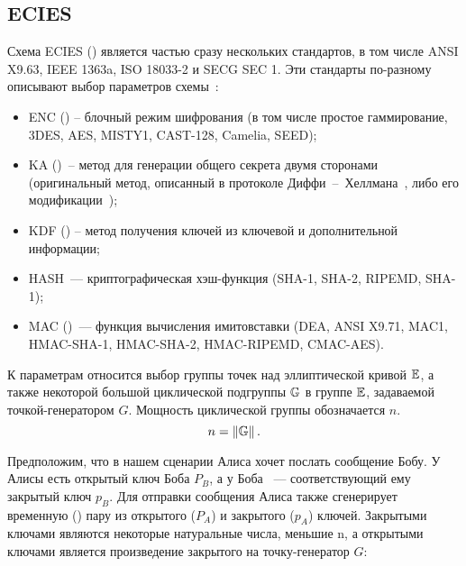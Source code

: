 \subsection{ECIES}

Схема ECIES () является частью сразу нескольких стандартов, в том числе ANSI X9.63, IEEE 1363a, ISO 18033-2 и SECG SEC 1. Эти стандарты по-разному описывают выбор параметров схемы~\cite{Martinez:Encinas:Avila:2010}:

\begin{itemize}
	\item ENC () -- блочный режим шифрования (в том числе простое гаммирование, 3DES, AES, MISTY1, CAST-128, Camelia, SEED);
	\item KA ()~-- метод для генерации общего секрета двумя сторонами (оригинальный метод, описанный в протоколе Диффи~--~Хеллмана~\cite{Diffie:Hellman:1976}, либо его модификации~\cite{Miller:1986});
	\item KDF () -- метод получения ключей из ключевой и дополнительной информации;
	\item HASH~--- криптографическая хэш-функция (SHA-1, SHA-2, RIPEMD, SHA-1);
	\item MAC ()~--- функция вычисления имитовставки (DEA, ANSI X9.71, MAC1, HMAC-SHA-1, HMAC-SHA-2, HMAC-RIPEMD, CMAC-AES).
\end{itemize}

К параметрам относится выбор группы точек над эллиптической кривой $\mathbb{E}$, а также некоторой большой циклической подгруппы $\mathbb{G}$ в группе $\mathbb{E}$, задаваемой точкой-генератором $G$. Мощность циклической группы обозначается $n$.
\[n = \left\| \mathbb{G} \right\|.\]

Предположим, что в нашем сценарии Алиса хочет послать сообщение Бобу. У Алисы есть открытый ключ Боба $P_B$, а у Боба ~--- соответствующий ему закрытый ключ $p_B$. Для отправки сообщения Алиса также сгенерирует временную () пару из открытого ($P_A$) и закрытого ($p_A$) ключей. Закрытыми ключами являются некоторые натуральные числа, меньшие n, а открытыми ключами является произведение закрытого на точку-генератор $G$:

